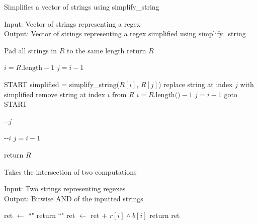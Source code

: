 \documentclass[runningheads]{llncs}
\begin{document}
\begin{algorithm}[H]
\caption{Simplifies a vector of strings using simplify\_string}
Input: Vector of strings representing a regex\\
Output: Vector of strings representing a regex simplified using simplify\_string
\begin{algorithmic}
    \State Pad all strings in $R$ to the same length 
        \State return $R$ 
        \EndIf
    
    \State $i = R\text{.length} - 1$
    \State $j = i - 1$
    
    \State START
            \State simplified = simplify\_string($R[i]$, $R[j]$) 
                \State replace string at index $j$ with simplified 
                \State remove string at index $i$ from $R$ 
                \State $i = R\text{.length()} - 1$
                \State $j = i - 1$
                \State goto START
                \EndIf
                
            \State -{}-$j$
            \EndWhile
            
        \State -{}-$i$
        \State $j = i - 1$
        \EndWhile
        
    \State return $R$
\EndProcedure
\end{algorithmic}
\end{algorithm}
\begin{algorithm}[H]
\caption{Takes the intersection of two computations}
Input: Two strings representing regexes\\
Output: Bitwise AND of the inputted strings
\begin{algorithmic}
    \State ret $\leftarrow$ ``" 
        \State return ``" 
        \Else 
        \State ret $\leftarrow$ ret $+$ $r[i] \land b[i]$ 
        \EndIf
    \EndFor
    \State return ret
\EndProcedure
\end{algorithmic}
\end{algorithm}
\end{document}
